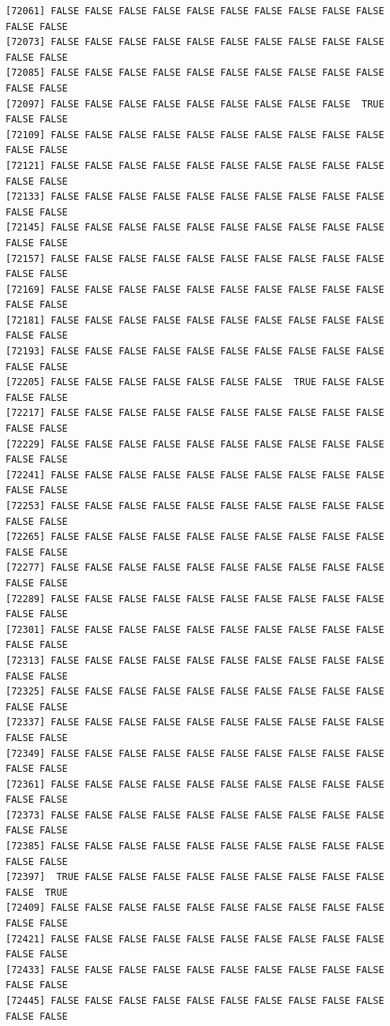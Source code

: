 \documentclass[
  a4paper,
  DIV=11,
  numbers=noendperiod]{scrartcl}
\begin{document}
\begin{verbatim}
[72061] FALSE FALSE FALSE FALSE FALSE FALSE FALSE FALSE FALSE FALSE FALSE FALSE
[72073] FALSE FALSE FALSE FALSE FALSE FALSE FALSE FALSE FALSE FALSE FALSE FALSE
[72085] FALSE FALSE FALSE FALSE FALSE FALSE FALSE FALSE FALSE FALSE FALSE FALSE
[72097] FALSE FALSE FALSE FALSE FALSE FALSE FALSE FALSE FALSE  TRUE FALSE FALSE
[72109] FALSE FALSE FALSE FALSE FALSE FALSE FALSE FALSE FALSE FALSE FALSE FALSE
[72121] FALSE FALSE FALSE FALSE FALSE FALSE FALSE FALSE FALSE FALSE FALSE FALSE
[72133] FALSE FALSE FALSE FALSE FALSE FALSE FALSE FALSE FALSE FALSE FALSE FALSE
[72145] FALSE FALSE FALSE FALSE FALSE FALSE FALSE FALSE FALSE FALSE FALSE FALSE
[72157] FALSE FALSE FALSE FALSE FALSE FALSE FALSE FALSE FALSE FALSE FALSE FALSE
[72169] FALSE FALSE FALSE FALSE FALSE FALSE FALSE FALSE FALSE FALSE FALSE FALSE
[72181] FALSE FALSE FALSE FALSE FALSE FALSE FALSE FALSE FALSE FALSE FALSE FALSE
[72193] FALSE FALSE FALSE FALSE FALSE FALSE FALSE FALSE FALSE FALSE FALSE FALSE
[72205] FALSE FALSE FALSE FALSE FALSE FALSE FALSE  TRUE FALSE FALSE FALSE FALSE
[72217] FALSE FALSE FALSE FALSE FALSE FALSE FALSE FALSE FALSE FALSE FALSE FALSE
[72229] FALSE FALSE FALSE FALSE FALSE FALSE FALSE FALSE FALSE FALSE FALSE FALSE
[72241] FALSE FALSE FALSE FALSE FALSE FALSE FALSE FALSE FALSE FALSE FALSE FALSE
[72253] FALSE FALSE FALSE FALSE FALSE FALSE FALSE FALSE FALSE FALSE FALSE FALSE
[72265] FALSE FALSE FALSE FALSE FALSE FALSE FALSE FALSE FALSE FALSE FALSE FALSE
[72277] FALSE FALSE FALSE FALSE FALSE FALSE FALSE FALSE FALSE FALSE FALSE FALSE
[72289] FALSE FALSE FALSE FALSE FALSE FALSE FALSE FALSE FALSE FALSE FALSE FALSE
[72301] FALSE FALSE FALSE FALSE FALSE FALSE FALSE FALSE FALSE FALSE FALSE FALSE
[72313] FALSE FALSE FALSE FALSE FALSE FALSE FALSE FALSE FALSE FALSE FALSE FALSE
[72325] FALSE FALSE FALSE FALSE FALSE FALSE FALSE FALSE FALSE FALSE FALSE FALSE
[72337] FALSE FALSE FALSE FALSE FALSE FALSE FALSE FALSE FALSE FALSE FALSE FALSE
[72349] FALSE FALSE FALSE FALSE FALSE FALSE FALSE FALSE FALSE FALSE FALSE FALSE
[72361] FALSE FALSE FALSE FALSE FALSE FALSE FALSE FALSE FALSE FALSE FALSE FALSE
[72373] FALSE FALSE FALSE FALSE FALSE FALSE FALSE FALSE FALSE FALSE FALSE FALSE
[72385] FALSE FALSE FALSE FALSE FALSE FALSE FALSE FALSE FALSE FALSE FALSE FALSE
[72397]  TRUE FALSE FALSE FALSE FALSE FALSE FALSE FALSE FALSE FALSE FALSE  TRUE
[72409] FALSE FALSE FALSE FALSE FALSE FALSE FALSE FALSE FALSE FALSE FALSE FALSE
[72421] FALSE FALSE FALSE FALSE FALSE FALSE FALSE FALSE FALSE FALSE FALSE FALSE
[72433] FALSE FALSE FALSE FALSE FALSE FALSE FALSE FALSE FALSE FALSE FALSE FALSE
[72445] FALSE FALSE FALSE FALSE FALSE FALSE FALSE FALSE FALSE FALSE FALSE FALSE

\end{verbatim}
\end{document}
